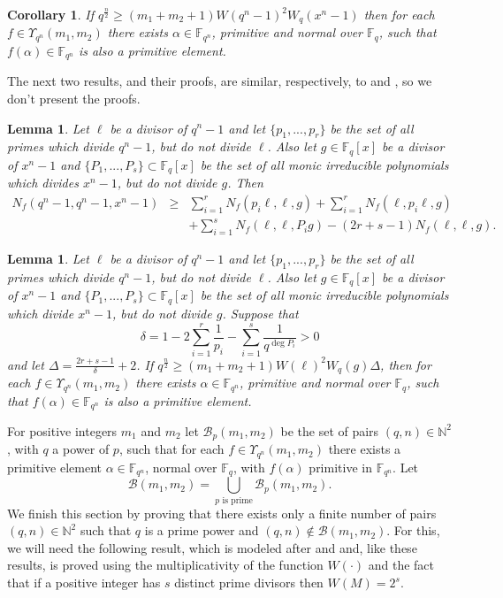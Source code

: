 \documentclass[12pt]{article}
\newtheorem{lemma}[theorem]{Lemma}
\newtheorem{corollary}[theorem]{Corollary}
\newcommand{\F}{\mathbb{F}}
\newcommand{\N}{\mathbb{N}}
\def\Bb {\mathcal{B}}
\begin{document}
\begin{corollary}\label{mainresult}
If
$q^{\frac{n}{2}} \geq (m_1 + m_2+1) W(q^n-1)^2W_q(x^n-1)$
then 
for each $ f \in \Upsilon_{q^n} (m_1,m_2)$
there exists $\alpha \in \mathbb{F}_{q^n}$, primitive and normal
over $\mathbb{F}_q$, such that $f(\alpha) \in \mathbb{F}_{q^n}$  is also a 
primitive element.	
\end{corollary}


The next two results, and their proofs, are similar, respectively, to \cite[Lemma 3.4]{CGJV} and
\cite[Lemma 3.5]{CGJV}, so we don't present the proofs.

\begin{lemma}
	Let $\ell$ be a divisor of $q^n-1$ and let $\{p_1,...,p_r\}$ be the set of all 
	primes which divide $q^n-1$,
	but do not divide $\ell$.
	Also let $g \in \F_q[x]$ be a divisor of $x^n -1$ and $\{P_1,...,P_s\} 
	\subset \F_q[x]$
	be the set of all monic irreducible polynomials which
	divides $x^n -1$, but do not divide $g$. Then
\begin{eqnarray}
N_f(q^n-1,q^n-1,x^n-1) & \geq &
\sum_{i=1}^{r}N_f(p_i \ell,\ell,g)
+
\sum_{i=1}^{r}N_f(\ell,p_i \ell,g) \nonumber \\
& &
+\sum_{i=1}^{s}N_f( \ell,\ell, P_i g)
-
(2r+s-1)N_f(\ell,\ell,g). \nonumber
\end{eqnarray}
\end{lemma}


\begin{lemma} \label{divisores}
Let $\ell$ be a divisor of $q^n-1$ and let $\{p_1,...,p_r\}$ be the set of all 
primes which divide $q^n-1$,
but do not divide $\ell$.
Also let $g \in \F_q[x]$ be a divisor of $x^n -1$ and $\{P_1,...,P_s\} \subset 
\F_q[x]$
be the set of all monic irreducible polynomials which
divide $x^n -1$, but do not divide $g$.
Suppose that
$$
\delta=1-2\sum_{i=1}^{r}\frac{1}{p_i} - \sum_{i=1}^{s}\frac{1}{q^{\deg P_i}} >0
$$
and let  $\Delta=\frac{2r+s-1}{\delta}+2$. If 
$q^{\frac{n}{2}} \geq 
(m_1 + m_2+1)
W(\ell)^2W_q(g) \Delta$, then 
for each $ f \in \Upsilon_{q^n} (m_1,m_2)$
there exists $\alpha \in \mathbb{F}_{q^n}$, primitive and normal
over $\mathbb{F}_q$, such that $f(\alpha) \in \mathbb{F}_{q^n}$  is also a 
primitive element.	
\end{lemma}

For  positive integers
$m_1$ and $m_2$ let  $\Bb_p(m_1,m_2)$
	be the set of pairs $(q,n) \in \mathbb{N}^2$, with $q$ a power of $p$,
	such that for each $ f \in \Upsilon_{q^n} (m_1,m_2)$ there exists a 
	primitive
	element
	$\alpha \in \F_{q^n}$, normal over $\F_q$, with
	$f(\alpha)$ primitive in $\F_{q^n}$.
Let 
$$
\Bb(m_1,m_2) = \bigcup_{p \text{ is prime}} \Bb_p(m_1,m_2).
$$
We finish this section by proving that 
there exists only a finite number
of pairs $(q,n) \in \N^2$ such that $q$ is a prime power and
$(q,n) \notin \Bb(m_1,m_2)$. 
For this,
we will need the following result, which is modeled after
\cite[Lemma 3.3]{CH} and
\cite[Lemma 4.1]{Kapetanakis-Reis} and, like these results, is proved using the 
multiplicativity of the function $W(\cdot)$ and the fact that if a positive 
integer has $s$ distinct prime divisors then $W(M) = 2^s$.
\end{document}
